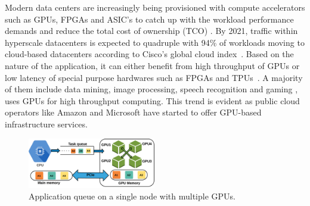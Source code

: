 
    Modern data centers are increasingly being provisioned with compute accelerators such as GPUs, FPGAs and ASIC's to catch up with the workload performance demands and reduce the total cost of ownership (TCO) \cite{caulfield2016cloud}. By 2021, traffic within hyperscale datacenters is expected to quadruple with 94\% of workloads moving to cloud-based datacenters according to Cisco's global cloud index~\cite{cisco}. Based on the nature of the application, it can either benefit from high throughput of GPUs or low latency of special purpose hardwares such as FPGAs and TPUs~\cite{jouppi2017datacenter}. A majority of them include data mining, image processing, speech recognition and gaming \cite{1659988, Povey11thekaldi,10.1007/11744023_32}, uses GPUs for high throughput computing. This trend is evident as public cloud operators like Amazon \cite{amazon} and Microsoft \cite{microsoft} have started to offer GPU-based infrastructure services.

\begin{figure}[!tbp]
\centering
  \includegraphics[width=.84\linewidth,height=2.2cm]{figs/cpu-gpu-queue.pdf}
  \vspace{-2mm}
  \caption{Application queue on a single node with multiple GPUs.}
  \vspace{-2mm}
  \label{fig:queue}
\end{figure}


